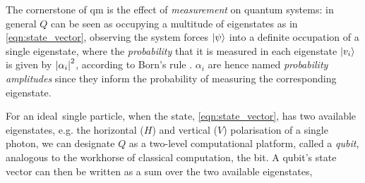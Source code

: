 The cornerstone of \gls{qm} is the effect of \emph{measurement} on quantum systems: 
    in general $Q$ can be seen as occupying a multitude of eigenstates as in \cref{eqn:state_vector}, 
    observing the system forces $\ket{\psi}$ into a definite occupation of a single eigenstate,
    where the \emph{probability} that it is measured in each eigenstate $\ket{v_i}$ is given by $\left\lvert \alpha_i \right\rvert^2$, 
    according to Born's rule \cite{born1926quantenmechanik}.
$\alpha_i$ are hence named \emph{probability amplitudes} since they inform the probability of measuring the corresponding eigenstate. 
\par 

For an ideal\footnotemark \ single particle, when the state, \cref{eqn:state_vector}, has two available eigenstates, 
    e.g. the horizontal ($H$) and vertical ($V$) polarisation of a single photon, 
    we can designate $Q$ as a two-level computational platform, called a \emph{qubit}, 
    analogous to the workhorse of classical computation, the bit. 
A qubit's state vector can then be written as a sum over the two available eigenstates, 

